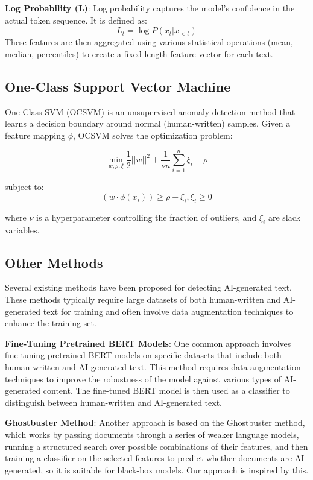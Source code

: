 \textbf{Log Probability (L)}: Log probability captures the model’s confidence
in the actual token sequence. It is defined as:
\begin{equation}
    L_t = \log P(x_t|x_{<t})
\end{equation}
These features are then aggregated using various statistical operations (mean, median, percentiles) to create a fixed-length feature vector for each text.

\subsection{One-Class Support Vector Machine}
One-Class SVM (OCSVM) is an unsupervised anomaly detection method that learns a decision boundary around normal (human-written) samples. Given a feature mapping $\phi$, OCSVM solves the optimization problem:

\begin{equation}
    \min_{w,\rho,\xi} \frac{1}{2}||w||^2 + \frac{1}{\nu n}\sum_{i=1}^n \xi_i - \rho
\end{equation}

subject to:
\begin{equation}
    (w \cdot \phi(x_i)) \geq \rho - \xi_i, \xi_i \geq 0
\end{equation}

where $\nu$ is a hyperparameter controlling the fraction of outliers, and $\xi_i$ are slack variables.

\subsection{Other Methods}
Several existing methods have been proposed for detecting AI-generated text. These methods typically require large datasets of both human-written and AI-generated text for training and often involve data augmentation techniques to enhance the training set.

\textbf{Fine-Tuning Pretrained BERT Models}: One common approach involves fine-tuning pretrained BERT models on specific datasets that include both human-written and AI-generated text. This method requires data augmentation techniques to improve the robustness of the model against various types of AI-generated content. The fine-tuned BERT model is then used as a classifier to distinguish between human-written and AI-generated text.

\textbf{Ghostbuster Method}: Another approach is based on the Ghostbuster method, which works by passing documents through a series of weaker language models, running a structured search over possible combinations of their features, and then training a classifier on the selected features to predict whether documents are AI-generated, so it is suitable for black-box models. Our approach is inspired by this.

